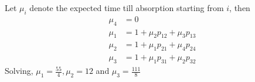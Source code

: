 \documentclass[11pt, a4paper]{article}
\begin{document}
    Let $\mu_{i}$ denote the expected time till absorption starting from $i$, then
    \begin{align*}
        \mu_{4} &= 0 \\
        \mu_{1} &= 1 + \mu_{2}p_{12} + \mu_{3}p_{13} \\
        \mu_{2} &= 1 + \mu_{1}p_{21} + \mu_{4}p_{24} \\
        \mu_{3} &= 1 + \mu_{1}p_{31} + \mu_{2}p_{32}
    \end{align*}
    Solving, $\mu_{1} = \frac{55}{4}, \mu_{2} = 12$ and $\mu_{3} = \frac{111}{8}$ \newline

\end{document}
